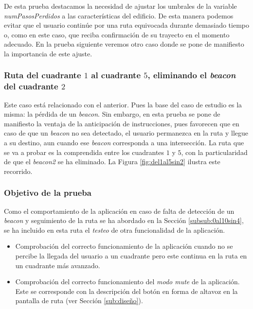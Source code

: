 De esta prueba destacamos la necesidad de ajustar los umbrales de la variable \textit{numPasosPerdidos} a las características del edificio. De esta manera podemos evitar que el usuario continúe por una ruta equivocada durante demasiado tiempo o, como en este caso, que reciba confirmación de su trayecto en el momento adecuado. En la prueba siguiente veremos otro caso donde se pone de manifiesto la importancia de este ajuste.


\subsubsection{Ruta del cuadrante $1$ al cuadrante $5$, eliminando el \textit{beacon} del cuadrante $2$}
\label{subsub:1al5sin2}

Este caso está relacionado con el anterior. Pues la base del caso de estudio es la misma: la pérdida de un \textit{beacon}. Sin embargo, en esta prueba se pone de manifiesto la ventaja de la anticipación de instrucciones, pues favorecen que en caso de que un \textit{beacon} no sea detectado, el usuario permanezca en la ruta y llegue a su destino, aun cuando ese \textit{beacon} corresponda a una intersección. La ruta que se va a probar es la comprendida entre los cuadrantes $1$ y $5$, con la particularidad de que el \textit{beacon2} se ha eliminado. La Figura \ref{fig:del1al5sin2} ilustra este recorrido.

\subsubsection*{Objetivo de la prueba}

Como el comportamiento de la aplicación en caso de falta de detección de un \textit{beacon} y seguimiento de la ruta se ha abordado en la Sección \ref{subsub:0al10sin4}, se ha incluido en esta ruta el \textit{testeo} de otra funcionalidad de la aplicación. 

\begin{itemize}
	\item Comprobación del correcto funcionamiento de la aplicación cuando no se percibe la llegada del usuario a un cuadrante pero este continua en la ruta en un cuadrante más avanzado.
	
	\item Comprobación del correcto funcionamiento del \textit{modo mute} de la aplicación. Este se corresponde con la descripción del botón en forma de altavoz en la pantalla de ruta (ver Sección \ref{sub:diseño}). 
\end{itemize}



